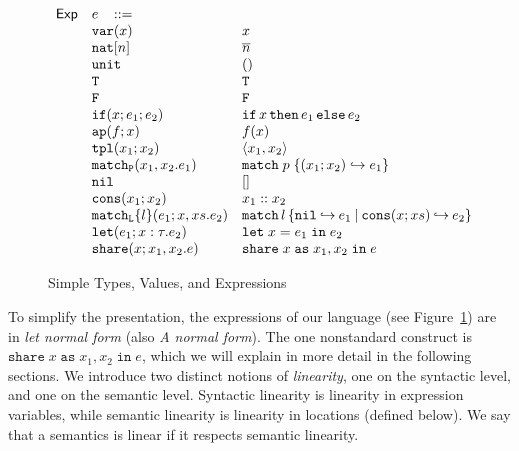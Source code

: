 \documentclass{easychair}
\newcommand{\ms}[1]{\ensuremath{\mathsf{#1}}}
\newcommand{\irl}[1]{\mathtt{#1}}
\newcommand{\paircaseabt}[4]{\irl{match_P}(#2,#3.#4)}
\newcommand{\paircasecst}[4]{\irl{match} \; #1\; \{(#2;#3) \hookrightarrow #4\}}
\newcommand{\sharecst}[4]{\irl{share}\;#1\;\irl{as}\;#2,#3\;\irl{in}\;#4}
\newcommand{\shareabt}[4]{\irl{share}(#1;#2,#3.#4)}
\theoremstyle{definition}
\begin{document}
\begin{figure}[t!]
\begin{minipage}[t]{0.66\linewidth}
\[\begin{array}{r l l l}
\ms{Exp}
        & e   \,\,\,\,\, ::= \\
 	& \irl{var}(x)                                			& x 											\\	
  & \irl{nat}[n]							& \numeral{n}											\\	
  & \irl{unit}							& ()											\\	
  & \irl{T}							& \irl{T}											\\	
  & \irl{F}	   					& \irl{F}											\\	
  & \ifexabt{x}{e_1}{e_2} & \ifexcst{x}{e_1}{e_2} \\ 
  & \irl{ap}(f;x) 					& \appcst{f}{x} 									\\	
  & \irl{tpl}(x_1;x_2)     	& \pairexcst{x_1}{x_2}                								\\	
 	& \paircaseabt{p}{x_1}{x_2}{e_1}					& \paircasecst{p}{x_1}{x_2}{e_1}   \\	
 	& \nilexabt					& []   									\\	
 	& \consexabt{x_1}{x_2}					& x_1::x_2   									\\	
 	& \listcaseexabt{l}{e_1}{x}{xs}{e_2}					& \listcaseexcst{l}{e_1}{x}{xs}{e_2}   \\	
  & \irl{let}(e_1; x : \tau.e_2)			& \irl{let}\; x = e_1 \; \irl{in}\; e_2   \\	
  & \shareabt{x}{x_1}{x_2}{e} &\sharecst{x}{x_1}{x_2}{e}\\ 
\end{array}
\]
\end{minipage}

	\caption{Simple Types, Values, and Expressions }
\label{fig:exp}
\end{figure}

To simplify the presentation, the expressions of our language (see Figure~\ref{fig:exp}) are in \emph{let normal form} (also \emph{A normal form}).
The one nonstandard construct is $\sharecst{x}{x_1}{x_2}{e}$, which we will explain in more 
detail in the following sections. We introduce two distinct notions of \emph{linearity}, one on 
the syntactic level, and one on the semantic level. Syntactic linearity is linearity in 
expression variables, while semantic linearity is linearity in locations (defined below).
We say that a semantics is linear if it respects semantic linearity.
\end{document}
